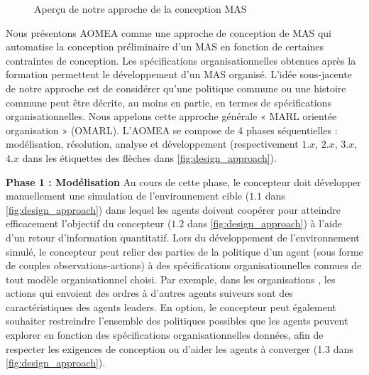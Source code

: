 \begin{figure}[h!]
  \centering
  
  \caption{Aperçu de notre approche de la conception MAS}
  \label{fig:design_approach}
\end{figure}

Nous présentons AOMEA comme une approche de conception de MAS qui automatise la conception préliminaire d'un MAS en fonction de certaines contraintes de conception. Les spécifications organisationnelles obtenues après la formation permettent le développement d'un MAS organisé.
L'idée sous-jacente de notre approche est de considérer qu'une politique commune ou une histoire commune peut être décrite, au moins en partie, en termes de spécifications organisationnelles.
Nous appelons cette approche générale « MARL orientée organisation » (OMARL).
%
%
L'AOMEA se compose de 4 phases séquentielles : modélisation, résolution, analyse et développement (respectivement $1.x$, $2.x$, $3.x$, $4.x$ dans les étiquettes des flèches dans \autoref{fig:design_approach}).

\textbf{Phase 1 : Modélisation} \quad Au cours de cette phase, le concepteur doit développer manuellement une simulation de l'environnement cible ($1.1$ dans \autoref{fig:design_approach}) dans lequel les agents doivent coopérer pour atteindre efficacement l'objectif du concepteur ($1.2$ dans \autoref{fig:design_approach}) à l'aide d'un retour d'information quantitatif. Lors du développement de l'environnement simulé, le concepteur peut relier des parties de la politique d'un agent (sous forme de couples observations-actions) à des spécifications organisationnelles connues de tout modèle organisationnel choisi.
Par exemple, dans les organisations , les actions qui envoient des ordres à d'autres agents suiveurs sont des caractéristiques des agents leaders.
En option, le concepteur peut également souhaiter restreindre l'ensemble des politiques possibles que les agents peuvent explorer en fonction des spécifications organisationnelles données, afin de respecter les exigences de conception ou d'aider les agents à converger (1.3 dans \autoref{fig:design_approach}).

